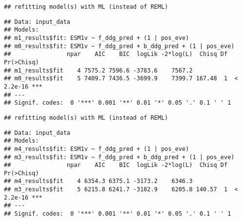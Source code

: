 \documentclass[
]{article}
\newenvironment{Shaded}{\begin{snugshade}}{\end{snugshade}}
\newcommand{\CommentTok}[1]{\textcolor[rgb]{0.56,0.35,0.01}{\textit{#1}}}
\newcommand{\FunctionTok}[1]{\textcolor[rgb]{0.13,0.29,0.53}{\textbf{#1}}}
\newcommand{\NormalTok}[1]{#1}
\newcommand{\SpecialCharTok}[1]{\textcolor[rgb]{0.81,0.36,0.00}{\textbf{#1}}}
\begin{document}
\begin{verbatim}
## refitting model(s) with ML (instead of REML)
\end{verbatim}

\begin{verbatim}
## Data: input_data
## Models:
## m1_results$fit: ESM1v ~ f_ddg_pred + (1 | pos_eve)
## m0_results$fit: ESM1v ~ f_ddg_pred + b_ddg_pred + (1 | pos_eve)
##                npar    AIC    BIC  logLik -2*log(L)  Chisq Df Pr(>Chisq)    
## m1_results$fit    4 7575.2 7596.6 -3783.6    7567.2                         
## m0_results$fit    5 7409.7 7436.5 -3699.9    7399.7 167.48  1  < 2.2e-16 ***
## ---
## Signif. codes:  0 '***' 0.001 '**' 0.01 '*' 0.05 '.' 0.1 ' ' 1
\end{verbatim}

\begin{Shaded}
\end{Shaded}

\begin{verbatim}
## refitting model(s) with ML (instead of REML)
\end{verbatim}

\begin{verbatim}
## Data: input_data
## Models:
## m4_results$fit: ESM1v ~ f_ddg_pred + (1 | pos_eve)
## m3_results$fit: ESM1v ~ f_ddg_pred + b_ddg_pred + (1 | pos_eve)
##                npar    AIC    BIC  logLik -2*log(L)  Chisq Df Pr(>Chisq)    
## m4_results$fit    4 6354.3 6375.1 -3173.2    6346.3                         
## m3_results$fit    5 6215.8 6241.7 -3102.9    6205.8 140.57  1  < 2.2e-16 ***
## ---
## Signif. codes:  0 '***' 0.001 '**' 0.01 '*' 0.05 '.' 0.1 ' ' 1
\end{verbatim}
\end{document}
